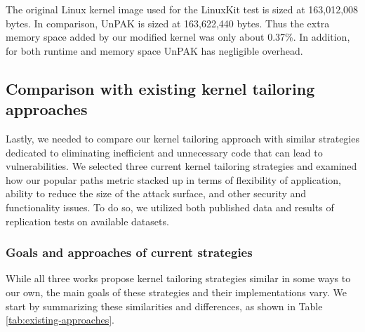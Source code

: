 The original Linux kernel image used for the LinuxKit test  is sized at 163,012,008 bytes. In comparison, UnPAK is sized at 163,622,440 bytes. 
Thus the extra memory space added by our modified kernel was only about 0.37\%. In addition, for both runtime and memory space UnPAK has negligible overhead.

\subsection{Comparison with existing kernel tailoring approaches}
\label{sec.evaluation.5} 
Lastly, we needed to compare our kernel tailoring approach with similar strategies dedicated to eliminating  inefficient and unnecessary code that can lead to vulnerabilities. 
We selected three current kernel tailoring  strategies and examined how our popular paths metric stacked up in terms of flexibility of application, 
ability to reduce the size of the attack surface, and other security and functionality issues. To do so, we utilized both published data and results of replication tests on available datasets. 

\subsubsection{Goals and approaches of current strategies}
\label{sec.evaluation.5.1}
While all three works  propose kernel tailoring strategies similar in some ways to our own, the main goals  of these strategies and their implementations vary. 
We start by summarizing these similarities and differences, as shown in Table \ref{tab:existing-approaches}.  

